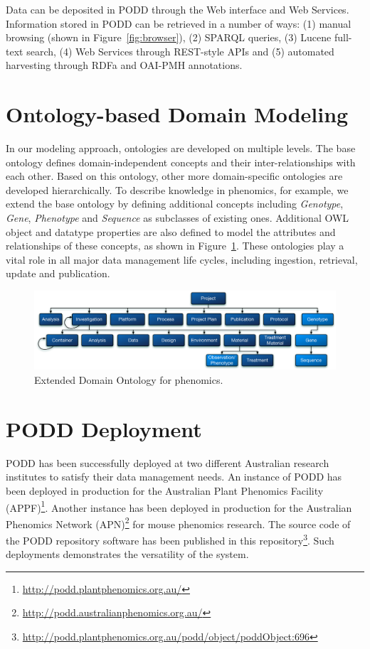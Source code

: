 \documentclass{llncs}
\begin{document}
Data can be deposited in PODD through the Web interface and Web Services. Information stored in PODD can be retrieved in a number of ways: (1) manual browsing (shown in Figure~\ref{fig:browser}), (2) SPARQL queries, (3) Lucene full-text search, (4) Web Services through REST-style APIs and (5) automated harvesting through RDFa and OAI-PMH annotations.

\section{Ontology-based Domain Modeling}\label{sec:ont}
In our modeling approach, ontologies are developed on multiple levels. The base ontology defines domain-independent concepts and their inter-relationships with each other. Based on this ontology, other more domain-specific ontologies are developed hierarchically. To describe knowledge in phenomics, for example, we extend the base ontology
by defining additional concepts including \emph{Genotype}, \emph{Gene},
\emph{Phenotype} and \emph{Sequence} as subclasses of
existing ones. Additional OWL object and datatype properties are
also defined to model the attributes and relationships of these
concepts, as shown in Figure~\ref{fig:podd_high}. These ontologies play a vital role in all major data management life cycles, including ingestion, retrieval, update and publication.

\vspace{-20pt}
\begin{figure}[htb]
\centering
\includegraphics[trim = 2mm 0mm 2mm 0mm, clip,width=\textwidth]{ont_podd.pdf}
\vspace{-16pt} \caption{Extended Domain Ontology for
phenomics.}\label{fig:podd_high}
\end{figure}

\vspace{-32pt}
\section{PODD Deployment}\label{sec:podd}
PODD has been successfully deployed at two different Australian research institutes to satisfy their data management needs. An instance of PODD has been deployed in production for the Australian Plant Phenomics Facility (APPF)\footnote{\url{http://podd.plantphenomics.org.au/}}. Another instance has been deployed in production for the Australian Phenomics Network (APN)\footnote{\url{http://podd.australianphenomics.org.au/}} for mouse phenomics research. The source code of the PODD repository software has been published in this repository\footnote{\url{http://podd.plantphenomics.org.au/podd/object/poddObject:696}}. Such deployments demonstrates the versatility of the system.
\end{document}

